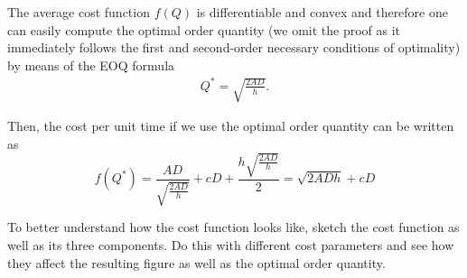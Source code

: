 \begin{solution}
The average cost function $f(Q)$ is differentiable and convex and therefore one can easily compute the optimal order quantity  (we omit the proof as it immediately follows the first and second-order necessary conditions of optimality) by means of the EOQ formula
\begin{align*}
Q^*=\sqrt{\frac{2AD}{h}}.
\end{align*}

Then, the cost per unit time if we use the optimal order quantity can be written as 
\begin{equation*}
f(Q^*) = \frac{AD}{\sqrt{\frac{2AD}{h}}}+cD+\frac{h\sqrt{\frac{2AD}{h}}}{2} = \sqrt{2ADh} + cD
\end{equation*}


\end{solution}

\begin{question}
To better understand how the cost function looks like, sketch the cost function as well as its three components. Do this with different cost parameters and see how they affect the resulting figure as well as the optimal order quantity.
\end{question}

